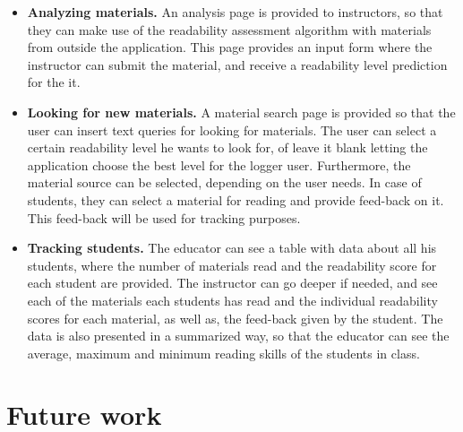 \documentclass{sig-alternate-05-2015}
\begin{document}
\begin{itemize}
\item \textbf{Analyzing materials.} An analysis page is provided to instructors, so that they can make use of the readability assessment algorithm \cite{imadrazo2016readability} with materials from outside the application. This page provides an input form where the instructor can submit the material, and receive a readability level prediction for the it.
\item \textbf{Looking for new materials.} A material search page is provided so that the user can insert text queries for looking for materials. The user can select a certain readability level he wants to look for, of leave it blank letting the application choose the best level for the logger user. Furthermore, the material source can be selected, depending on the user needs. In case of students, they can select a material for reading and provide feed-back on it. This feed-back will be used for tracking purposes.


\item \textbf{Tracking students.} The educator can see a table with data about all his students, where the number of materials read and the readability score for each student are provided. The instructor can go deeper if needed, and see each of the materials each students has read and the individual readability scores for each material, as well as, the feed-back given by the student. The data is also presented in a summarized way, so that the educator can see the average, maximum and minimum reading skills of the students in class.

\end{itemize}


\section{Future work}
\end{document}
